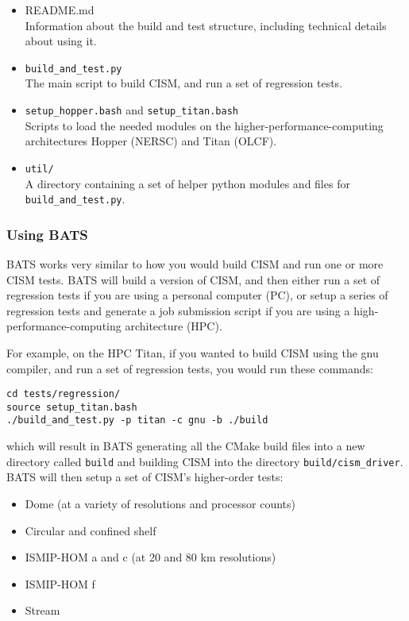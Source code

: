 \begin{itemize}
	\item README.md \\
		Information about the build and test structure, including technical details about using it.
    \item \texttt{build\_and\_test.py} \\
		The main script to build CISM, and run a set of regression tests.
    \item \texttt{setup\_hopper.bash} and \texttt{setup\_titan.bash} \\
        Scripts to load the needed modules on the higher-performance-computing architectures Hopper (NERSC) and Titan
        (OLCF).
    \item \texttt{util/} \\
        A directory containing a set of helper python modules and files for \texttt{build\_and\_test.py}.
\end{itemize}

\subsubsection{Using BATS} 

BATS works very similar to how you would build CISM and run one or more CISM tests. BATS will
build a version of CISM, and then either run a set of regression tests if you are using a personal computer (PC), or
setup a series of regression tests and generate a job submission script if you are using a high-performance-computing
architecture (HPC). 

\par
For example, on the HPC Titan, if you wanted to build CISM using the gnu compiler, and run a set of regression tests,
you would run these commands: 

\begin{verbatim}
cd tests/regression/
source setup_titan.bash
./build_and_test.py -p titan -c gnu -b ./build
\end{verbatim}

\noindent
which will result in BATS generating all the CMake build files into a new directory called \texttt{build} and building
CISM into the directory \texttt{build/cism\_driver}. BATS will then setup a set of CISM's higher-order tests:

\begin{itemize}
    \item Dome (at a variety of resolutions and processor counts) \\
    \item Circular and confined shelf \\
    \item ISMIP-HOM a and c (at 20 and 80 km resolutions) \\
    \item ISMIP-HOM f \\
    \item Stream \\
\end{itemize}

